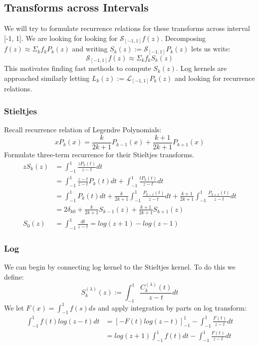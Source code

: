 \documentclass{article}
\begin{document}
\subsection{Transforms across Intervals}
We will try to formulate recurrence relations for these transforms across interval [-1, 1].
We are looking for looking for $\mathcal{S}_{[-1,1]}f(z)$.
Decomposing $f(z) \approx \Sigma_k f_kP_k(z)$ and writing $S_k(z):=\mathcal{S}_{[-1,1]}P_k(z)$ lets us write:
$$\mathcal{S}_{[-1,1]}f(z) \approx \Sigma_k f_kS_k(z)$$
This motivates finding fast methods to compute $S_k(z)$. Log kernels are approached similarly letting $L_k(z):=\mathcal{L}_{[-1,1]}P_k(z)$ and looking for recurrence relations.
\subsubsection*{Stieltjes}
Recall recurrence relation of Legendre Polynomials:
\begin{equation}\label{legendre recurrence}
	xP_k(x) = \frac{k}{2k+1}P_{k-1}(x) + \frac{k+1}{2k+1}P_{k+1}(x)
\end{equation}
Formulate three-term recurrence for their Stieltjes transforms.
\begin{equation}
\begin{split}
	zS_k(z) &= \int_{-1}^{1}\frac{zP_k(t)}{z-t}dt \\
	&= \int_{-1}^{1}\frac{z-t}{z-t}P_k(t)dt+\int_{-1}^{1}\frac{tP_k(t)}{z-t}dt \\
	&= \int_{-1}^{1}P_k(t)dt+\frac{k}{2k+1}\int_{-1}^{1}\frac{P_{k-1}(t)}{z-t}dt+\frac{k+1}{2k+1}\int_{-1}^{1}\frac{P_{k+1}(t)}{z-t}dt \\
	&= 2\delta_{k0}+\frac{k}{2k+1}S_{k-1}(z)+\frac{k+1}{2k+1}S_{k+1}(z) \\
	S_0(z) &= \int_{-1}^{1}\frac{dt}{z-t} = log(z+1)-log(z-1)
\end{split}
\end{equation}
\subsubsection*{Log}
We can begin by connecting log kernel to the Stieltjes kernel. To do this we define:$$S_k^{(\lambda)}(z):=\int_{-1}^{1}\frac{C_k^{(\lambda)}(t)}{z-t}dt$$
We let $F(x) = \int_{-1}^1f(s)ds$ and apply integration by parts on log transform:
\begin{equation}
\begin{split}
	\int_{-1}^1f(t)log(z-t)dt &= [-F(t)log(z-t)]_{-1}^1-\int_{-1}^1\frac{F(t)}{z-t}dt \\
	&= log(z+1)\int_{-1}^1f(t)dt-\int_{-1}^1\frac{F(t)}{z-t}dt
\end{split}
\end{equation}
\end{document}
